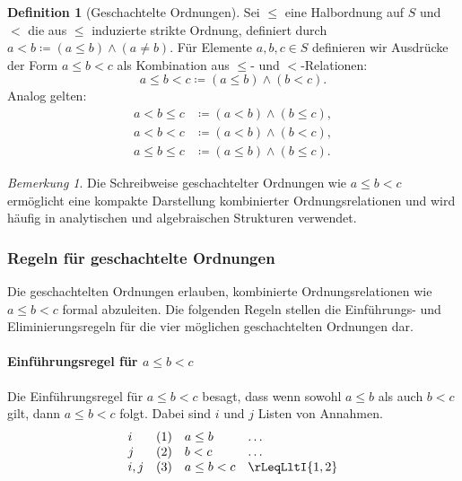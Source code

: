 \documentclass{book}
\theoremstyle{plain}
\theoremstyle{remark}
\newtheorem*{remark}{Bemerkung}
\theoremstyle{definition}
\newtheorem{definition}{Definition}[section]
\begin{document}
\begin{definition}[Geschachtelte Ordnungen]
    Sei \(\leq\) eine Halbordnung auf \(S\) und \(<\) die aus \(\leq\) induzierte strikte Ordnung, definiert durch \( a < b \coloneqq (a \leq b) \land (a \neq b) \). Für Elemente \(a, b, c \in S\) definieren wir Ausdrücke der Form \(a \leq b < c\) als Kombination aus \(\leq\)- und \(<\)-Relationen:
    \[
    a \leq b < c \coloneqq (a \leq b) \land (b < c).
    \]
    Analog gelten:
    \begin{align*}
        a < b \leq c &\coloneqq (a < b) \land (b \leq c), \\
        a < b < c &\coloneqq (a < b) \land (b < c), \\
        a \leq b \leq c &\coloneqq (a \leq b) \land (b \leq c).
    \end{align*}
\end{definition}

\begin{remark}
    Die Schreibweise geschachtelter Ordnungen wie \(a \leq b < c\) ermöglicht eine kompakte Darstellung kombinierter Ordnungsrelationen und wird häufig in analytischen und algebraischen Strukturen verwendet.
\end{remark}

\subsubsection{Regeln für geschachtelte Ordnungen}
\label{rule:rLeqLltE} \label{rule:rLeqLltI}
\label{rule:rLltLeqE} \label{rule:rLltLeqI}
\label{rule:rLltLltE} \label{rule:rLltLltI}
\label{rule:rLeqLeqE} \label{rule:rLeqLeqI}

Die geschachtelten Ordnungen erlauben, kombinierte Ordnungsrelationen wie \(a \leq b < c\) formal abzuleiten. Die folgenden Regeln stellen die Einführungs- und Eliminierungsregeln für die vier möglichen geschachtelten Ordnungen dar.

\paragraph{Einführungsregel für \(a \leq b < c\)}
Die Einführungsregel für \(a \leq b < c\) besagt, dass wenn sowohl \(a \leq b\) als auch \(b < c\) gilt, dann \(a \leq b < c\) folgt. Dabei sind \(i\) und \(j\) Listen von Annahmen.
\[
\begin{array}{llll}
    i   & (1) & a \leq b & \dots \\
    j   & (2) & b < c & \dots \\
    i,j & (3) & a \leq b < c & \rLeqLltI{1,2}
\end{array}
\]
\end{document}
